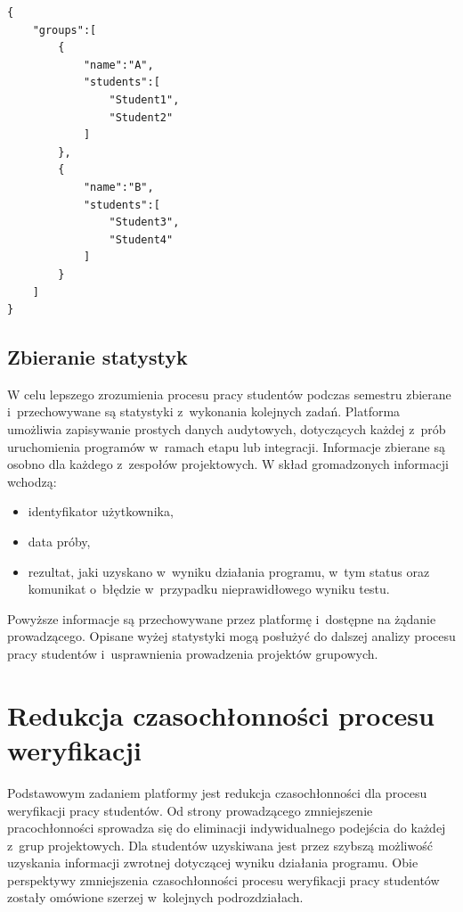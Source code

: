 {\selectfont
\scriptsize
\begin{lstlisting}
{
    "groups":[
        {
            "name":"A",
            "students":[
                "Student1",
                "Student2"
            ]
        },
        {
            "name":"B",
            "students":[
                "Student3",
                "Student4"
            ]
        }
    ]
}
\end{lstlisting}
}

\subsection{Zbieranie statystyk}

W celu lepszego zrozumienia procesu pracy studentów podczas semestru zbierane i~przechowywane są statystyki z~wykonania kolejnych zadań.
Platforma umożliwia zapisywanie prostych danych audytowych, dotyczących każdej z~prób uruchomienia programów w~ramach etapu lub integracji.
Informacje zbierane są osobno dla każdego z~zespołów projektowych.
W skład gromadzonych informacji wchodzą:
\begin{itemize}
    \item identyfikator użytkownika,
    \item data próby,
    \item rezultat, jaki uzyskano w~wyniku działania programu, w~tym status oraz komunikat o~błędzie w~przypadku nieprawidłowego wyniku testu.
\end{itemize}
Powyższe informacje są przechowywane przez platformę i~dostępne na żądanie prowadzącego.
Opisane wyżej statystyki mogą posłużyć do dalszej analizy procesu pracy studentów i~usprawnienia prowadzenia projektów grupowych.


\section{Redukcja czasochłonności procesu weryfikacji}

Podstawowym zadaniem platformy jest redukcja czasochłonności dla procesu weryfikacji pracy studentów.
Od strony prowadzącego zmniejszenie pracochłonności sprowadza się do eliminacji indywidualnego podejścia do każdej z~grup projektowych.
Dla studentów uzyskiwana jest przez szybszą możliwość uzyskania informacji zwrotnej dotyczącej wyniku działania programu.
Obie perspektywy zmniejszenia czasochłonności procesu weryfikacji pracy studentów zostały omówione szerzej w~kolejnych podrozdziałach.

